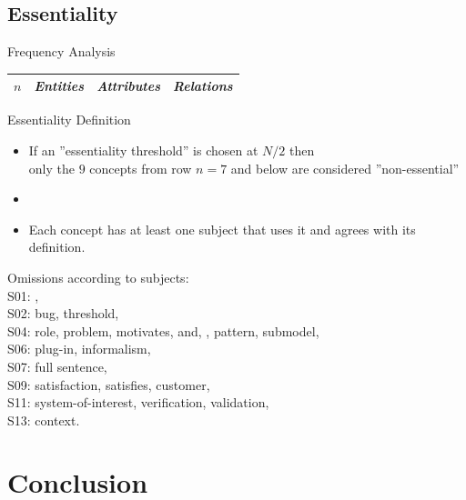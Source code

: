 \documentclass{slides}
\begin{document}
\subsection{Essentiality}
\begin{Slide}{Frequency Analysis}
\fontsize{6}{8}\selectfont

\begin{tabular}{l | p{} | p{} | p{}}
\textit{$n$} & \textit{Entities} & \textit{Attributes} & \textit{Relations} \\ \hline

\end{tabular}

\end{Slide}

\begin{Slide}{Essentiality Definition}
\begin{itemize}
\item If an ''essentiality threshold'' is chosen at $N/2$ then \\ only the $9$ concepts from row $n = 7$ and below are considered ''non-essential''
\item {} 
\item Each concept has at least one subject that uses it and agrees with its definition. 
\end{itemize}
\end{Slide}

\begin{Slide}{Omissions}
{} according to subjects:\\
S01: , \\
S02: bug, threshold, \\
S04: role, problem, motivates, and, , pattern, submodel, \\
S06: plug-in, informalism, \\
S07: full sentence, \\
S09: satisfaction, satisfies, customer, \\
S11: system-of-interest, verification, validation, \\
S13: context. 

\end{Slide}


\section{Conclusion}
\end{document}
